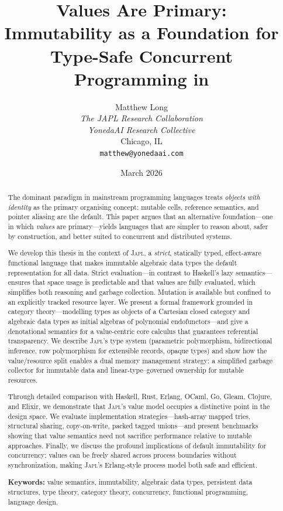 \documentclass[11pt]{article}
\title{\textbf{Values Are Primary:}\\
  Immutability as a Foundation for\\
  Type-Safe Concurrent Programming in \japl}
\author{
  Matthew Long \\
  \textit{The JAPL Research Collaboration} \\
  \textit{YonedaAI Research Collective} \\
  Chicago, IL \\
  \texttt{matthew@yonedaai.com}
}
\date{March 2026}
\theoremstyle{definition}
\theoremstyle{remark}
\newcommand{\japl}{\textsc{Japl}}
\begin{document}
\maketitle

\begin{abstract}

The dominant paradigm in mainstream programming languages treats
\emph{objects with identity} as the primary organising concept:
mutable cells, reference semantics, and pointer aliasing are the
default.  This paper argues that an alternative foundation---one in
which \emph{values} are primary---yields languages that are simpler to
reason about, safer by construction, and better suited to concurrent
and distributed systems.

We develop this thesis in the context of \japl{}, a \emph{strict},
statically typed, effect-aware functional language that makes immutable
algebraic data types the default representation for all data.  Strict
evaluation---in contrast to Haskell's lazy semantics---ensures that
space usage is predictable and that values are fully evaluated, which
simplifies both reasoning and garbage collection.  Mutation is available
but confined to an explicitly tracked resource layer.  We present a
formal framework grounded in category theory---modelling types as
objects of a Cartesian closed category and algebraic data types as
initial algebras of polynomial endofunctors---and give a denotational
semantics for a value-centric core calculus that guarantees referential
transparency.  We describe \japl{}'s type system (parametric
polymorphism, bidirectional inference, row polymorphism for extensible
records, opaque types) and show how the value/resource split
enables a dual memory management strategy: a simplified garbage
collector for immutable data and linear-type--governed ownership for
mutable resources.

Through detailed comparison with Haskell, Rust, Erlang, OCaml, Go,
Gleam, Clojure, and Elixir, we demonstrate that \japl{}'s value model
occupies a distinctive point in the design space.  We evaluate
implementation strategies---hash-array mapped tries, structural
sharing, copy-on-write, packed tagged unions---and present benchmarks
showing that value semantics need not sacrifice performance relative to
mutable approaches.  Finally, we discuss the profound implications of
default immutability for concurrency: values can be freely shared
across process boundaries without synchronization, making \japl{}'s
Erlang-style process model both safe and efficient.

\medskip
\noindent\textbf{Keywords:} value semantics, immutability, algebraic
data types, persistent data structures, type theory, category theory,
concurrency, functional programming, language design.

\end{abstract}
\end{document}
